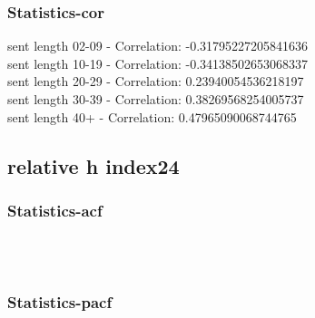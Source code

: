 \documentclass{article}%
\begin{document}
%
\newpage%
\subsubsection{Statistics{-}cor}%
\label{ssubsec:Statistics{-}cor}%
\noindent%
sent length 02-09 - Correlation: -0.31795227205841636\\%
sent length 10-19 - Correlation: -0.34138502653068337\\%
sent length 20-29 - Correlation: 0.23940054536218197\\%
sent length 30-39 - Correlation: 0.38269568254005737\\%
sent length 40+ - Correlation: 0.47965090068744765\\

%
\newpage

%
\subsection{relative h index24}%
\label{subsec:relativehindex24}%
\subsubsection{Statistics{-}acf}%
\label{ssubsec:Statistics{-}acf}%


\begin{figure}[ht]%
\centering%
\setlength{\abovecaptionskip}{-35pt}%
%
%
\\%
%
%
\\%
%
\end{figure}

%
\newpage%
\subsubsection{Statistics{-}pacf}%
\label{ssubsec:Statistics{-}pacf}%
\end{document}
